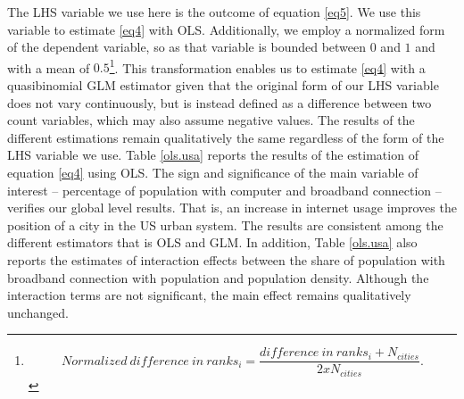 \documentclass[10pt,letterpaper]{article}
\begin{document}
The LHS variable we use here is the outcome of equation \ref{eq5}. We
use this variable to estimate \ref{eq4} with OLS. Additionally, we
employ a normalized form of the dependent variable, so as that variable
is bounded between \(0\) and \(1\) and with a mean of \(0.5\)\footnote{\[Normalized\:difference\:in\:ranks_{i} = \frac{difference\:in\:ranks_{i} + N_{cities}}{2xN_{cities}}.\]}.
This transformation enables us to estimate \ref{eq4} with a
quasibinomial GLM estimator given that the original form of our LHS
variable does not vary continuously, but is instead defined as a
difference between two count variables, which may also assume negative
values. The results of the different estimations remain qualitatively
the same regardless of the form of the LHS variable we use. Table
\ref{ols.usa} reports the results of the estimation of equation
\ref{eq4} using OLS. The sign and significance of the main variable of
interest -- percentage of population with computer and broadband
connection -- verifies our global level results. That is, an increase in
internet usage improves the position of a city in the US urban system.
The results are consistent among the different estimators that is OLS
and GLM. In addition, Table \ref{ols.usa} also reports the estimates of
interaction effects between the share of population with broadband
connection with population and population density. Although the
interaction terms are not significant, the main effect remains
qualitatively unchanged.
\end{document}
